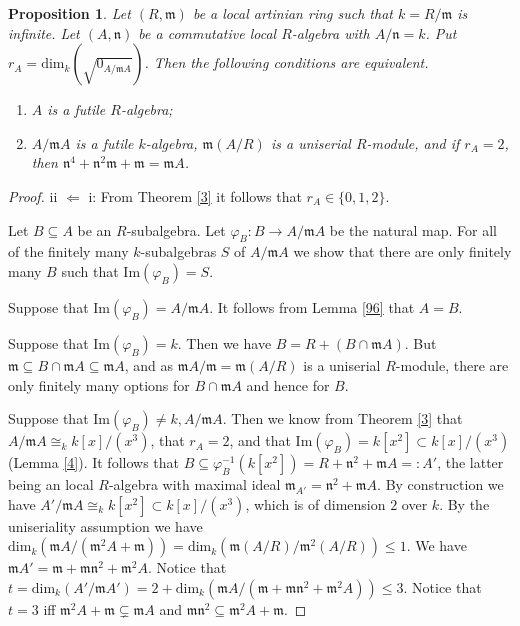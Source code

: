 \documentclass{amsart}
\theoremstyle{plain}
\newtheorem{proposition}[theorem]{Proposition}
\theoremstyle{definition}
\begin{document}
\begin{proposition} \label{122}
Let $(R,{\mathfrak{m}})$ be a local artinian ring such that $k=R/{\mathfrak{m}}$ is infinite. Let $(A,\mathfrak{n})$ be a commutative local $R$-algebra with $A/\mathfrak{n}
=k$. Put $r_A= \mathrm{dim}_{k}(\sqrt{0_{A/{\mathfrak{m}} A}})$. Then the following conditions are
equivalent.
\begin{enumerate}
 \item $A$ is a futile $R$-algebra;
 \item $A/{\mathfrak{m}} A$ is a futile $k$-algebra, ${\mathfrak{m}} (A/R)$ is a uniserial $R$-module, and if $r_{A}=2$, then
$\mathfrak{n}^4+\mathfrak{n}^2{\mathfrak{m}}+{\mathfrak{m}}={\mathfrak{m}} A$.
\end{enumerate}
\end{proposition}
\begin{proof}
ii ${\Longleftarrow}$ i: From Theorem \ref{3} it follows that $r_A \in
\{0,1,2\}$.

Let $B \subseteq A$ be an $R$-subalgebra. Let $\varphi_B: B \to A/{\mathfrak{m}} A$ be the natural map. For all of the finitely many $k$-subalgebras $S$ of $A/{\mathfrak{m}} A$ we show that there are only finitely many $B$ such that $\mathrm{Im}(\varphi_B)=S$. 

Suppose that $\mathrm{Im}(\varphi_B)=A/{\mathfrak{m}} A$. It follows from Lemma \ref{96} that $A=B$.

Suppose that $\mathrm{Im}(\varphi_B)=k$. Then we have $B=R+(B \cap {\mathfrak{m}} A)$. But ${\mathfrak{m}} \subseteq B \cap {\mathfrak{m}} A \subseteq {\mathfrak{m}} A$, and as ${\mathfrak{m}} A/{\mathfrak{m}}={\mathfrak{m}}(A/R)$ is
a uniserial $R$-module, there are only finitely many options for $B \cap {\mathfrak{m}} A$ and hence for $B$.

Suppose that $\mathrm{Im}(\varphi_B) \neq k, A/{\mathfrak{m}} A$. Then we know from Theorem \ref{3} that $A/{\mathfrak{m}} A \cong_k k[x]/(x^3)$, that
$r_A=2$, and that $\mathrm{Im}(\varphi_B)=k[x^2] \subset k[x]/(x^3)$ (Lemma \ref{4}). It follows that $B \subseteq
\varphi_B^{-1}(k[x^2])=R+\mathfrak{n}^2+{\mathfrak{m}} A=:A'$,
the latter being
an local $R$-algebra with maximal ideal ${\mathfrak{m}}_{A'}=\mathfrak{n}^2+{\mathfrak{m}} A$. By construction we have $A'/{\mathfrak{m}} A \cong_k k[x^2] \subset k[x]/(x^3)$, which is
of dimension $2$ over $k$. By the uniseriality
assumption we have $\mathrm{dim}_k({\mathfrak{m}}
A/({\mathfrak{m}}^2 A+{\mathfrak{m}}))= \mathrm{dim}_k \left({\mathfrak{m}} (A/R)/{\mathfrak{m}}^2(A/R)\right) \leq 1$. We have ${\mathfrak{m}} A'={\mathfrak{m}}+{\mathfrak{m}} \mathfrak{n}^2+{\mathfrak{m}}^2 A$. Notice that $t=\mathrm{dim}_k(A'/{\mathfrak{m}} A')=2+\mathrm{dim}_k({\mathfrak{m}} A/\left( {\mathfrak{m}} + {\mathfrak{m}} \mathfrak{n}^2+{\mathfrak{m}}^2 A \right)) \leq 3$. 
Notice that $t=3$ iff ${\mathfrak{m}}^2 A+{\mathfrak{m}} \subsetneq {\mathfrak{m}} A$ and ${\mathfrak{m}} \mathfrak{n}^2 \subseteq {\mathfrak{m}}^2A+{\mathfrak{m}}$. 


\end{proof}
\end{document}
